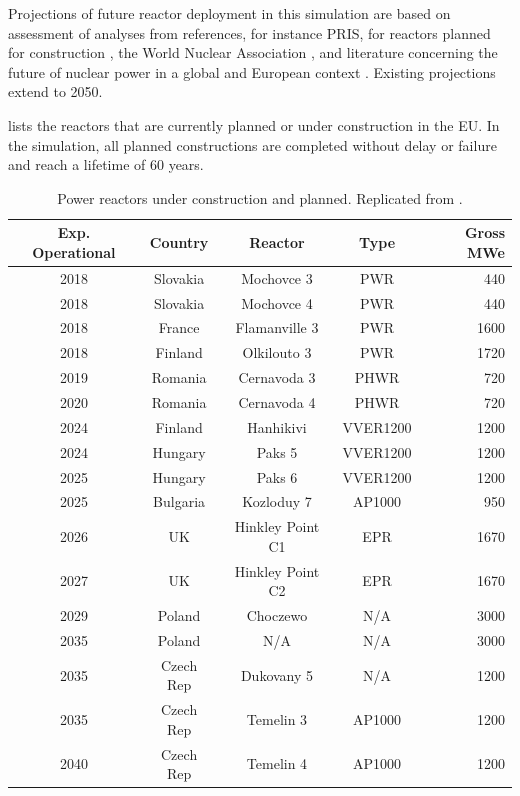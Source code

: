 \documentclass{article}
\begin{document}
Projections of future reactor deployment in this simulation are based on
assessment of analyses from references, for instance \gls{PRIS}, for reactors planned
for construction \cite{iaea_nuclear_2017}, the World Nuclear Association
\cite{world_nuclear_association_nuclear_2017}, and literature concerning the future of
nuclear power in a global \cite{joskow_future_2012} and European context
\cite{hatch_politics_2015}.  Existing projections extend to 2050.

 lists the reactors that are currently  planned or
under construction in the \gls{EU}. In the simulation, all  planned constructions are completed 
without delay or failure and reach a lifetime of 60 years.  

\pagebreak
\begin{table}[h]
    \centering
    \caption {Power reactors under construction and planned. Replicated from \cite{world_nuclear_association_nuclear_2017}.}
    \label{tab:eu_deployment}
    \begin{tabular}{ccccr}
        \hline
        \textbf{Exp. Operational }&\textbf{Country} &\textbf{Reactor} & \textbf{Type} & \textbf{Gross \gls{MWe}}\\
        \hline
        2018 & Slovakia  & Mochovce 3 & PWR & 440\\
        2018 & Slovakia & Mochovce 4 & PWR & 440 \\
        2018 & France & Flamanville 3 & PWR & 1600 \\
        2018 & Finland & Olkilouto 3 & PWR & 1720 \\
        2019 & Romania & Cernavoda 3 & PHWR & 720 \\
        2020 & Romania & Cernavoda 4 & PHWR & 720 \\
        2024 & Finland & Hanhikivi & VVER1200 & 1200 \\
        2024 & Hungary & Paks 5 & VVER1200 & 1200 \\
        2025 & Hungary & Paks 6 & VVER1200 & 1200 \\
        2025 & Bulgaria & Kozloduy 7 & \footnotemark AP1000 & 950 \\
        2026 & UK & Hinkley Point C1 & EPR & 1670 \\
        2027 & UK & Hinkley Point C2 & EPR & 1670 \\
        2029 & Poland & Choczewo & N/A & 3000 \\
        2035 & Poland & N/A & N/A & 3000 \\
        2035 & Czech Rep & Dukovany 5 & N/A & 1200 \\
        2035 & Czech Rep & Temelin 3 & AP1000 & 1200 \\
        2040 & Czech Rep & Temelin 4 & AP1000 & 1200 \\
        \hline
    \end{tabular}
\end{table}
\end{document}

